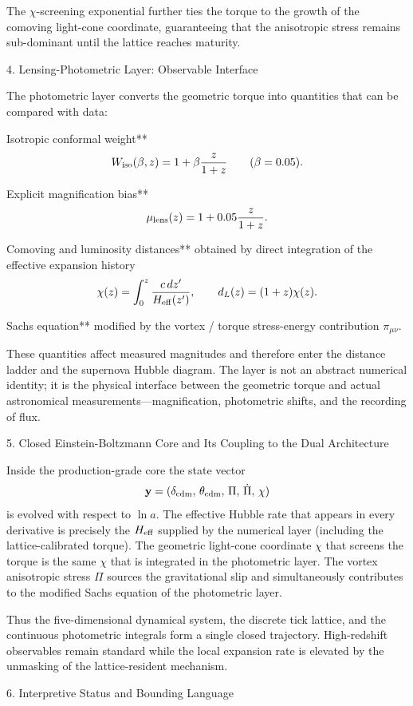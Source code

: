 The \(\chi\)-screening exponential further ties the torque to the growth of the comoving light-cone coordinate, guaranteeing that the anisotropic stress remains sub-dominant until the lattice reaches maturity.

4. Lensing-Photometric Layer: Observable Interface

The photometric layer converts the geometric torque into quantities that can be compared with data:

Isotropic conformal weight**  
  \[
  W_{\rm iso}(\beta,z)=1+\beta\frac{z}{1+z}\qquad(\beta=0.05).
  \]

Explicit magnification bias**  
  \[
  \mu_{\rm lens}(z)=1+0.05\frac{z}{1+z}.
  \]

Comoving and luminosity distances** obtained by direct integration of the effective expansion history  
  \[
  \chi(z)=\int_0^z\frac{c\,dz'}{H_{\rm eff}(z')},\qquad
  d_L(z)=(1+z)\chi(z).
  \]

Sachs equation** modified by the vortex / torque stress-energy contribution \(\pi_{\mu\nu}\).  

These quantities affect measured magnitudes and therefore enter the distance ladder and the supernova Hubble diagram. The layer is not an abstract numerical identity; it is the physical interface between the geometric torque and actual astronomical measurements—magnification, photometric shifts, and the recording of flux.

5. Closed Einstein-Boltzmann Core and Its Coupling to the Dual Architecture

Inside the production-grade core the state vector
\[
\mathbf{y}=(\delta_{\rm cdm},\,\theta_{\rm cdm},\,\Pi,\,\dot{\Pi},\,\chi)
\]
is evolved with respect to \(\ln a\). The effective Hubble rate that appears in every derivative is precisely the \(H_{\rm eff}\) supplied by the numerical layer (including the lattice-calibrated torque). The geometric light-cone coordinate \(\chi\) that screens the torque is the same \(\chi\) that is integrated in the photometric layer. The vortex anisotropic stress \(\Pi\) sources the gravitational slip and simultaneously contributes to the modified Sachs equation of the photometric layer.  

Thus the five-dimensional dynamical system, the discrete tick lattice, and the continuous photometric integrals form a single closed trajectory. High-redshift observables remain standard while the local expansion rate is elevated by the unmasking of the lattice-resident mechanism.

6. Interpretive Status and Bounding Language


